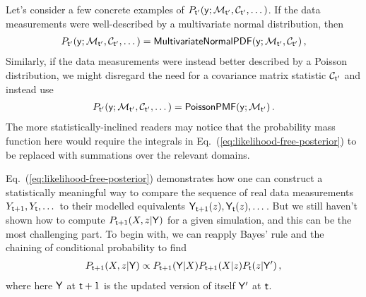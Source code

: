 Let's consider a few concrete examples of $P_{{\sf t}'}({\sf y};{\cal M}_{{\sf t}'},{\cal C}_{{\sf t}'}, \dots )$. If the data measurements were well-described by a multivariate normal distribution, then
\begin{align}
P_{{\sf t}'}({\sf y};{\cal M}_{{\sf t}'},{\cal C}_{{\sf t}'}, \dots ) = {\sf MultivariateNormalPDF}({\sf y};{\cal M}_{{\sf t}'},{\cal C}_{{\sf t}'})\,,
\end{align}
Similarly, if the data measurements were instead better described by a Poisson distribution, we might disregard the need for a covariance matrix statistic ${\cal C}_{{\sf t}'}$ and instead use
\begin{align}
P_{{\sf t}'}({\sf y};{\cal M}_{{\sf t}'},{\cal C}_{{\sf t}'}, \dots ) = {\sf PoissonPMF}({\sf y};{\cal M}_{{\sf t}'})\,.
\end{align}
The more statistically-inclined readers may notice that the probability mass function here would require the integrals in Eq.~(\ref{eq:likelihood-free-posterior}) to be replaced with summations over the relevant domains.

Eq.~(\ref{eq:likelihood-free-posterior}) demonstrates how one can construct a statistically meaningful way to compare the sequence of real data measurements $Y_{{\sf t}+1}, Y_{{\sf t}}, \dots$ to their modelled equivalents ${\sf Y}_{{\sf t}+1}(z), {\sf Y}_{{\sf t}}(z), \dots$. But we still haven't shown how to compute $P_{{\sf t}+1}(X,z\vert {\sf Y})$ for a given simulation, and this can be the most challenging part. To begin with, we can reapply Bayes' rule and the chaining of conditional probability to find 
\begin{align}
P_{{\sf t}+1}(X,z\vert {\sf Y}) \propto P_{{\sf t}+1}({\sf Y}\vert X)P_{{\sf t}+1}(X\vert z)P_{{\sf t}}(z\vert {\sf Y}') \,,
\end{align}
where here ${\sf Y}$ at ${\sf t}+1$ is the updated version of itself ${\sf Y}'$ at ${\sf t}$.

